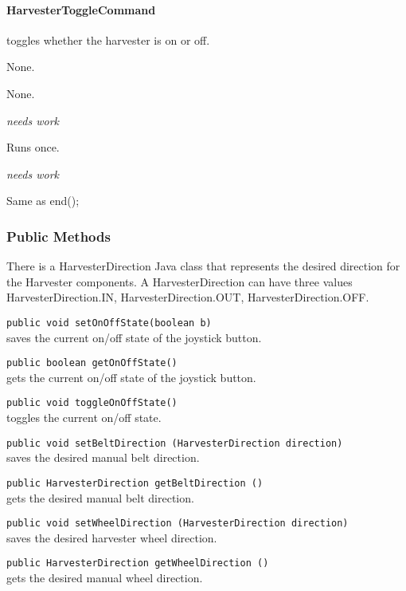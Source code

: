 \documentclass[]{article}
\begin{document}
\paragraph{HarvesterToggleCommand} toggles whether the harvester is on or off.
\begin{description}[topsep=0ex]
\item[requires] None.
\item[initialization]  None.
\item[execute] \emph{needs work}
\item[isDone] Runs once.
\item[end] \emph{needs work}
\item[interrupted] Same as end();
\end{description}

\subsubsection{Public Methods}

There is a HarvesterDirection Java class that represents the desired direction for the Harvester components.
A HarvesterDirection can have three values HarvesterDirection.IN, HarvesterDirection.OUT, HarvesterDirection.OFF.

\noindent
\lstinline[]|public void setOnOffState(boolean b)| \\
saves the current on/off state of the joystick button.

\noindent
\lstinline[]|public boolean getOnOffState()| \\
gets the current on/off state of the joystick button.

\noindent
\lstinline[]|public void toggleOnOffState()| \\
toggles the current on/off state.

\noindent
\lstinline[]|public void setBeltDirection (HarvesterDirection direction)| \\
saves the desired manual belt direction.

\noindent
\lstinline[]|public HarvesterDirection getBeltDirection ()| \\
gets the desired manual belt direction.

\noindent
\lstinline[]|public void setWheelDirection (HarvesterDirection direction)| \\
saves the desired harvester wheel direction.

\noindent
\lstinline[]|public HarvesterDirection getWheelDirection ()| \\
gets the desired manual wheel direction.
\end{document}

